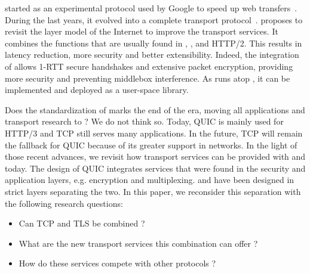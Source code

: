 \quic started as an experimental protocol used by Google to speed up web
transfers~\cite{roskind2013quic,langley2017quic}. During the last years, it
evolved into a complete transport protocol~\cite{rfc9000}. 
\quic proposes to
revisit the layer model of the Internet to improve the transport services.
It combines the functions that are usually found in \tcp, \tls, and HTTP/2. This results in
latency reduction, more security and better extensibility. Indeed, the integration of
 allows 1-RTT secure handshakes and extensive packet encryption, 
providing more security and preventing middlebox interference.
As \quic runs atop \udp, it can be implemented and deployed as a user-space library.

Does the standardization of \quic marks the end of the \tcp era, moving
all applications and transport research to \quic?  We do not think
so. Today, QUIC is mainly used for HTTP/3 and TCP still serves many applications.
In the future, TCP will remain the fallback for QUIC because of its greater support
in networks.
%
In the light of those recent advances, we revisit how transport services can be
provided with \tcp and \tls today. The design of QUIC integrates services
that were found in the security and application layers, e.g. encryption and multiplexing.
\tcp and \tls have been designed in strict layers separating the two.
In this paper, we reconsider this separation with the following research questions:

\begin{itemize}
	\item Can TCP and TLS be combined ?
	\item What are the new transport services this combination can offer ? 
	\item How do these services compete with other protocols ?
\end{itemize}

